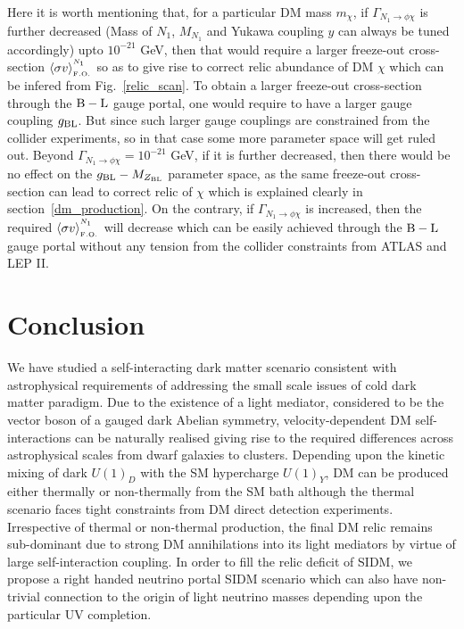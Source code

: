 \documentclass[prd,nofootinbib,preprint,superscriptaddress]{revtex4}
\begin{document}
Here it is worth mentioning that, for a particular DM mass $m_\chi$, if $\Gamma_{N_{1} \to \phi \chi}$ is further decreased (Mass of $N_1$, $M_{N_{1}}$ and Yukawa coupling $y$ can always be tuned accordingly) upto $10^{-21}$ GeV, then that would require a larger freeze-out cross-section $\langle\sigma v \rangle^{^{N_1}}_{_{ \rm F.O.}}$ so as to give rise to correct relic abundance of DM $\chi$ which can be infered from Fig.~\ref{relic_scan}. To obtain a larger freeze-out cross-section through the ${\rm B-L}$ gauge portal, one would require to have a larger gauge coupling $g_{\rm BL}$. But since such larger gauge couplings are constrained from the collider experiments, so in that case some more parameter space will get ruled out. Beyond $\Gamma_{N_{1} \to \phi \chi}=10^{-21}$ GeV, if it is further decreased, then there would be no effect on the $g_{\rm BL}-M_{Z_{\rm BL}}$ parameter space, as the same freeze-out cross-section can lead to correct relic of $\chi$ which is explained clearly in section~\ref{dm_production}. On the contrary, if $\Gamma_{N_{1} \to \phi \chi}$ is increased, then the required $\langle\sigma v \rangle^{^{N_1}}_{_{ \rm F.O.}}$ will decrease which can be easily achieved through the $\rm B-L$ gauge portal without any tension from the collider constraints from ATLAS and LEP II. 
\section{Conclusion}
\label{sec:conclude}
We have studied a self-interacting dark matter scenario consistent with astrophysical requirements of addressing the small scale issues of cold dark matter paradigm. Due to the existence of a light mediator, considered to be the vector boson of a gauged dark Abelian symmetry, velocity-dependent DM self-interactions can be naturally realised giving rise to the required differences across astrophysical scales from dwarf galaxies to clusters. Depending upon the kinetic mixing of dark $U(1)_D$ with the SM hypercharge $U(1)_Y$, DM can be produced either thermally or non-thermally from the SM bath although the thermal scenario faces tight constraints from DM direct detection experiments. Irrespective of thermal or non-thermal production, the final DM relic remains sub-dominant due to strong DM annihilations into its light mediators by virtue of large self-interaction coupling. In order to fill the relic deficit of SIDM, we propose a right handed neutrino portal SIDM scenario which can also have non-trivial connection to the origin of light neutrino masses depending upon the particular UV completion.
\end{document}
